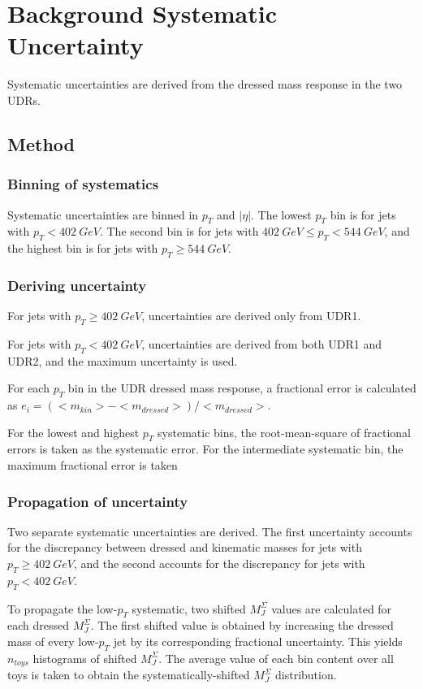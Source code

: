 \section{Background Systematic Uncertainty} \label{bkg_uncert}
Systematic uncertainties are derived from the dressed mass response in
the two UDRs.

\subsection{Method}

\subsubsection{Binning of systematics}
Systematic uncertainties are binned in $p_{T}$ and $|\eta|$. The lowest
$p_{T}$ bin is for jets with $p_{T} < 402~GeV$. The second bin is for
jets with $402~GeV \leq p_T
< 544~GeV$, and the highest bin is for jets with $p_T \geq 544~GeV$.

\subsubsection{Deriving uncertainty}
For jets with $p_{T} \geq 402~GeV$, uncertainties are derived only
from UDR1.

For jets with $p_{T} < 402~GeV$, uncertainties are derived from both
UDR1 and UDR2, and the maximum uncertainty is used.

For each $p_T$ bin in the UDR dressed mass response, a fractional
error is calculated as
$e_i=\left(<m_{kin}>-<m_{dressed}>\right)/<m_{dressed}>$.

For the lowest and highest $p_T$ systematic bins, the root-mean-square
of fractional errors is taken as the systematic error. For the
intermediate systematic bin, the maximum fractional error is taken

\subsubsection{Propagation of uncertainty}
Two separate systematic uncertainties are derived. The first
uncertainty accounts for the discrepancy between dressed and kinematic
masses for jets with $p_T \geq 402~GeV$, and the second accounts for the
discrepancy for jets with $p_T < 402~GeV$.

To propagate the low-$p_T$ systematic, two shifted $M_{J}^{\Sigma}$
values are calculated for each dressed $M_{J}^{\Sigma}$. The first
shifted value is obtained by increasing the dressed mass of every
low-$p_T$ jet by its corresponding fractional uncertainty. This yields
$n_{toys}$ histograms of shifted $M_{J}^{\Sigma}$. The average value
of each bin content over all toys is taken to obtain the
systematically-shifted $M_{J}^{\Sigma}$ distribution. 

